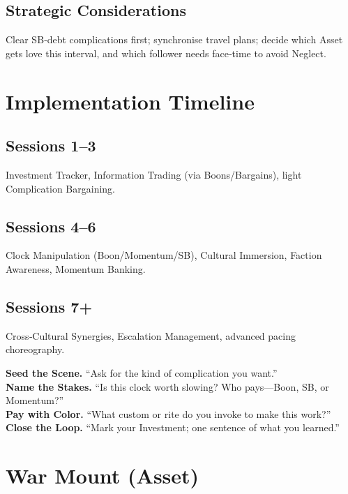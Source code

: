 \subsection{Strategic Considerations}
Clear SB‑debt complications first; synchronise travel plans; decide which Asset gets love this interval, and which follower needs face‑time to avoid Neglect.

\section{Implementation Timeline}

\subsection*{Sessions 1–3}
Investment Tracker, Information Trading (via Boons/Bargains), light Complication Bargaining.

\subsection*{Sessions 4–6}
Clock Manipulation (Boon/Momentum/SB), Cultural Immersion, Faction Awareness, Momentum Banking.

\subsection*{Sessions 7+}
Cross‑Cultural Synergies, Escalation Management, advanced pacing choreography.

\begin{tcolorbox}[colback=blue!5!white,colframe=blue!75!black,title=At‑Table Prompts,fonttitle=\bfseries]
\textbf{Seed the Scene.} “Ask for the kind of complication you want.”\\
\textbf{Name the Stakes.} “Is this clock worth slowing? Who pays—Boon, SB, or Momentum?”\\
\textbf{Pay with Color.} “What custom or rite do you invoke to make this work?”\\
\textbf{Close the Loop.} “Mark your Investment; one sentence of what you learned.”
\end{tcolorbox}

\section{War Mount (Asset)}
\label{subsec:war-mount}

